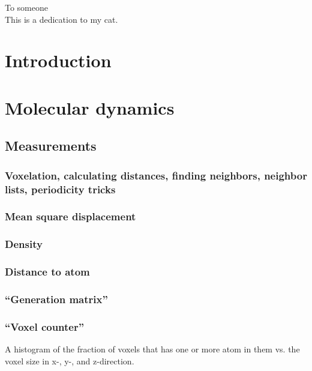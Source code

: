 \documentclass[twoside,english]{uiofysmaster}
\begin{document}

\cleardoublepage

\begin{abstract}
\lipsum
\end{abstract}

\begin{dedication}
  To someone
  \\\vspace{12pt}
  This is a dedication to my cat.
\end{dedication}

\begin{acknowledgements}
  \lipsum
\end{acknowledgements}

\tableofcontents

\part{Introduction}

\part{Molecular dynamics}
    


\chapter{Measurements}
    \section{Voxelation, calculating distances, finding neighbors, neighbor lists, periodicity tricks}
    \section{Mean square displacement}
    \section{Density}
    \section{Distance to atom}
    \section{``Generation matrix''}
    \section{``Voxel counter''}
        A histogram of the fraction of voxels that has one or more atom in them vs. the voxel size in x-, y-, and z-direction.
\end{document}
